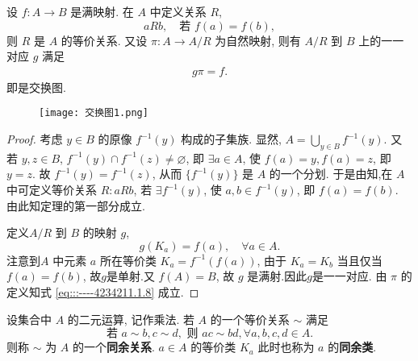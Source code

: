 \documentclass[../../main.tex]{subfiles}
\begin{document}
\begin{theorem}\label{theorem:一个满射可定义一个等价关系}
设 \( f:A \to B \) 是满映射. 在 \( A \) 中定义关系 \( R \),
\[
aRb,\quad \text{若 } f(a) = f(b),
\]
则 \( R \) 是 \( A \) 的等价关系. 又设 \( \pi:A \to A/R \) 为自然映射, 则有 \( A/R \) 到 \( B \) 上的一一对应 \( g \) 满足
\begin{align}
g\pi = f. \label{eq:::----4234211.1.8}
\end{align}
即是交换图.
\end{theorem}
\begin{figure}[H]
\centering
\texttt{[image: 交换图1.png]}
\caption{}
\label{figure:交换图1}
\end{figure}
\begin{proof}
考虑 \( y \in B \) 的原像 \( f^{-1}(y) \) 构成的子集族. 显然, \( A = \bigcup_{y \in B} f^{-1}(y) \). 又若 \( y,z \in B \), \( f^{-1}(y) \cap f^{-1}(z) \neq \varnothing \), 即 \( \exists a \in A \), 使 \( f(a) = y, f(a) = z \), 即 \( y = z \). 故 \( f^{-1}(y) = f^{-1}(z) \), 从而 \( \{ f^{-1}(y) \} \) 是 \( A \) 的一个分划. 于是由知,在 \( A \) 中可定义等价关系 \( R: aRb \), 若 \( \exists f^{-1}(y) \), 使 \( a,b \in f^{-1}(y) \), 即 \( f(a) = f(b) \). 由此知定理的第一部分成立.

定义\( A/R \) 到 \( B \) 的映射 \( g \),
\[
g(K_a) = f(a),\quad \forall a \in A.
\]
注意到\( A \) 中元素 \( a \) 所在等价类 \( K_a = f^{-1}(f(a)) \), 由于 \( K_a = K_b \) 当且仅当 \( f(a) = f(b) \), 故$g$是单射.又 \( f(A) = B \), 故 \( g \) 是满射.因此$g$是一一对应. 由 \( \pi \) 的定义知式 \eqref{eq:::----4234211.1.8} 成立.
\end{proof}

\begin{definition}[同余关系和同余类]
设集合中 \( A \) 的二元运算, 记作乘法. 若 \( A \) 的一个等价关系 \( \sim \) 满足
\[
\text{若 } a \sim b, c \sim d, \text{ 则 } ac \sim bd, \forall a,b,c,d \in A .
\]
则称 \( \sim \) 为 \( A \) 的一个\textbf{同余关系}. \( a \in A \) 的等价类 \( K_a \) 此时也称为 \( a \) 的\textbf{同余类}.
\end{definition}
\end{document}
